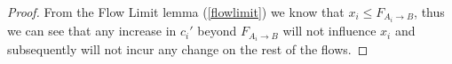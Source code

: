 \begin{proof}
  From the Flow Limit lemma (\ref{flowlimit}) we know that $x_i \leq F_{A_i \rightarrow B}$, thus we can see that any
  increase in $c_i'$ beyond $F_{A_i \rightarrow B}$ will not influence $x_i$ and subsequently will not incur any change on
  the rest of the flows.
\end{proof}
